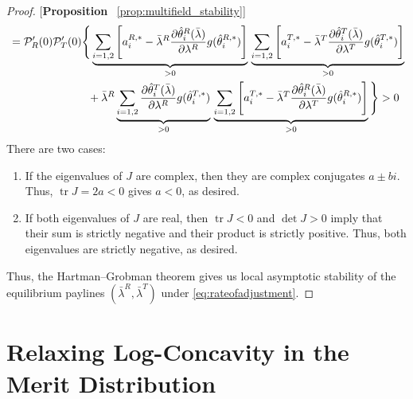 \begin{proof}{[\textbf{Proposition} ~\ref{prop:multifield_stability}]}
\begin{align*}
  &= \mathcal{P}_R'(0)\mathcal{P}_T'(0)\Bigg\{\underbrace{\sum_{i=1,2}\left[a_i^{R,*} - \bar{\lambda}^R\dfrac{\partial \hat{\theta}^R_i(\bar{\lambda})}{\partial \lambda^R}g(\hat{\theta}^{R,*}_i)\right]}_{>0}\,\underbrace{\sum_{i=1,2}\left[a_i^{T,*} - \bar{\lambda}^T\dfrac{\partial \hat{\theta}_i^T(\bar{\lambda})}{\partial \lambda^T}g(\hat{\theta}_i^{T,*})\right]}_{>0} \\
  &\hphantom{= \mathcal{P}_R'(0)\mathcal{P}_T'(0)\Bigg\{} + \bar{\lambda}^R\underbrace{\sum_{i=1,2}\dfrac{\partial \hat{\theta}_i^T(\bar{\lambda})}{\partial \lambda^R}g(\hat{\theta}^{T,*}_i)}_{>0}\,\underbrace{\sum_{i=1,2}\left[a_i^{T,*} - \bar{\lambda}^T\dfrac{\partial \hat{\theta}^R_i(\bar{\lambda})}{\partial \lambda^T}g(\hat{\theta}^{R,*}_i)\right]}_{>0}\Bigg\} > 0
\end{align*}
There are two cases:
\begin{enumerate}[label=(\arabic*),ref=\thelemma(\arabic*)]
  \item If the eigenvalues of $J$ are complex, then they are complex conjugates $a\pm bi$. Thus, $\operatorname{tr} J = 2a < 0$ gives $a<0$, as desired. 
  \item If both eigenvalues of $J$ are real, then $\operatorname{tr} J<0$ and $\operatorname{det} J>0$ imply that their sum is strictly negative and their product is strictly positive. Thus, both eigenvalues are strictly negative, as desired. 
\end{enumerate}
Thus, the Hartman--Grobman theorem gives us local asymptotic stability of the equilibrium paylines $(\bar{\lambda}^R,\bar{\lambda}^T)$ under \eqref{eq:rateofadjustment}.  
\end{proof}

\newpage
\section{Relaxing Log-Concavity in the Merit Distribution}\label{section:relax_logconcave}

